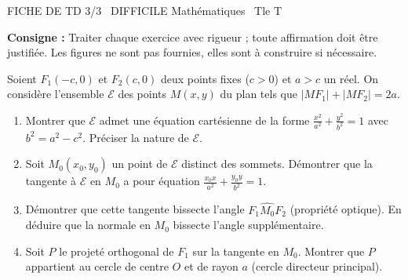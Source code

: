 \documentclass[11pt]{article}
\begin{document}
\begin{tcolorbox}[enhanced,colback=popink,colframe=popink,arc=10pt,boxrule=0pt,left=12pt,right=12pt,top=9pt,bottom=9pt]
{\color{white}\popxbold\small FICHE DE TD 3/3 \textbullet\ DIFFICILE \hfill Mathématiques \textbullet\ Tle T\par}
\end{tcolorbox}
\vspace{4pt}
\noindent\textbf{Consigne :} Traiter chaque exercice avec rigueur ; toute affirmation doit être justifiée. Les figures ne sont pas fournies, elles sont à construire si nécessaire.

\begin{exercice}
Soient $F_1(-c,0)$ et $F_2(c,0)$ deux points fixes ($c>0$) et $a>c$ un réel. On considère l'ensemble $\mathcal{E}$ des points $M(x,y)$ du plan tels que $|MF_1| + |MF_2| = 2a$.
\begin{enumerate}
    \item Montrer que $\mathcal{E}$ admet une équation cartésienne de la forme $\frac{x^2}{a^2} + \frac{y^2}{b^2} = 1$ avec $b^2 = a^2 - c^2$. Préciser la nature de $\mathcal{E}$.
    \item Soit $M_0(x_0,y_0)$ un point de $\mathcal{E}$ distinct des sommets. Démontrer que la tangente à $\mathcal{E}$ en $M_0$ a pour équation $\frac{x_0x}{a^2} + \frac{y_0y}{b^2} = 1$.
    \item Démontrer que cette tangente bissecte l'angle $\widehat{F_1 M_0 F_2}$ (propriété optique). En déduire que la normale en $M_0$ bissecte l'angle supplémentaire.
    \item Soit $P$ le projeté orthogonal de $F_1$ sur la tangente en $M_0$. Montrer que $P$ appartient au cercle de centre $O$ et de rayon $a$ (cercle directeur principal).
\end{enumerate}
\end{exercice}
\end{document}
